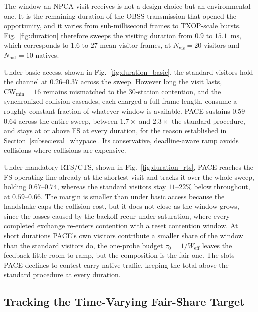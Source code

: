 \documentclass[conference]{IEEEtran}
\newcommand{\Nvis}{N_\mathrm{vis}}
\newcommand{\Nnat}{N_\mathrm{nat}}
\begin{document}
The window an NPCA visit receives is not a design choice but an
environmental one. It is the remaining duration of the OBSS transmission
that opened the opportunity, and it varies from sub-millisecond frames to
TXOP-scale bursts. Fig.~\ref{fig:duration} therefore sweeps the visiting
duration from $0.9$ to $15.1$~ms, which corresponds to $1.6$ to $27$ mean
visitor frames, at
$\Nvis=20$ visitors and $\Nnat=10$ natives.

Under basic access, shown in Fig.~\ref{fig:duration_basic}, the standard
visitors hold the channel at $0.26$--$0.37$ across the sweep. However
long the visit lasts, $\mathrm{CW}_{\min}=16$ remains mismatched to the
$30$-station contention, and the synchronized collision cascades, each
charged a full frame length, consume a roughly constant fraction of
whatever window is available. PACE sustains $0.59$--$0.64$ across the
entire sweep, between $1.7\times$ and $2.3\times$ the standard
procedure, and stays at or above FS at every duration, for the reason
established in Section~\ref{subsec:eval_whypace}. Its conservative,
deadline-aware ramp avoids collisions where collisions are expensive.

Under mandatory RTS/CTS, shown in Fig.~\ref{fig:duration_rts}, PACE reaches the
FS operating line already at the shortest visit and tracks it over the
whole sweep, holding $0.67$--$0.74$, whereas the standard visitors stay
$11$--$22\%$ below throughout, at $0.59$--$0.66$. The margin is smaller
than under basic access because the handshake caps the collision cost,
but it does not close as the window grows, since the losses caused by the backoff
recur under saturation, where every completed exchange
re-enters contention with a reset contention window. At short durations
PACE's own visitors contribute a smaller share of the window than the
standard visitors do, the one-probe budget
$\tau_0=1/W_\mathrm{eff}$ leaves the feedback little room to ramp, but
the composition is the fair one. The slots PACE declines to contest
carry native traffic, keeping the total above the standard procedure
at every duration.

\subsection{Tracking the Time-Varying Fair-Share Target}
\label{subsec:eval_tracking}
\end{document}
